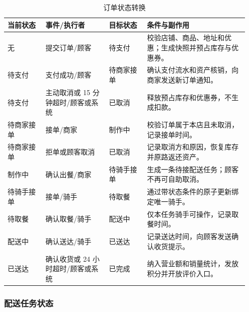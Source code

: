 \begin{longtable}{|L{0.15\linewidth}|L{0.25\linewidth}|L{0.15\linewidth}|L{0.40\linewidth}|}
\caption{订单状态转换}\label{tab:order-state}\\ \hline
\textbf{当前状态} & \textbf{事件/执行者} & \textbf{目标状态} & \textbf{条件与副作用} \\ \hline
无 & 提交订单/顾客 & 待支付 & 校验店铺、商品、地址和优惠；生成快照并预占库存与优惠券。 \\ \hline
待支付 & 支付成功/顾客 & 待商家接单 & 确认支付流水和资产核销，向商家发送新订单通知。 \\ \hline
待支付 & 主动取消或 15 分钟超时/顾客或系统 & 已取消 & 释放预占库存和优惠券，不生成扣款。 \\ \hline
待商家接单 & 接单/商家 & 制作中 & 校验订单属于本店且未取消，记录接单时间。 \\ \hline
待商家接单 & 拒单或顾客取消 & 已取消 & 记录取消方和原因，恢复库存并原路返还资产。 \\ \hline
制作中 & 确认出餐/商家 & 待骑手接单 & 生成一条待接配送任务；顾客不再可自助取消。 \\ \hline
待骑手接单 & 接单/骑手 & 待取餐 & 通过带状态条件的原子更新绑定唯一骑手。 \\ \hline
待取餐 & 确认取餐/骑手 & 配送中 & 仅本任务骑手可操作，记录取餐时间。 \\ \hline
配送中 & 确认送达/骑手 & 已送达 & 记录送达时间，向顾客发送确认收货提示。 \\ \hline
已送达 & 确认收货或 24 小时超时/顾客或系统 & 已完成 & 纳入营业额和销量统计，发放积分并开放评价入口。 \\ \hline
\end{longtable}

\subsubsection{配送任务状态}


